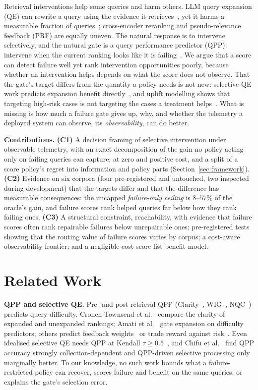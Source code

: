 \documentclass[sigconf,anonymous,review]{acmart}
\begin{document}
Retrieval interventions help some queries and harm others. LLM query
expansion (QE) can rewrite a query using the evidence it
retrieves~\cite{csqe}, yet it harms a measurable fraction of
queries~\cite{weller-qe-fails,qe-fails-unfamiliar}; cross-encoder
reranking and pseudo-relevance feedback (PRF) are equally uneven. The
natural response is to intervene selectively, and the natural gate is
a query performance predictor (QPP): intervene when the current
ranking looks like it is failing~\cite{amati-selective,adaptive-rag}.
We argue that a score can detect failure well yet rank intervention
opportunities poorly, because whether an intervention helps depends on
what the score does not observe.
That the gate's target differs from the quantity a policy needs is
not new: selective-QE work predicts expansion benefit
directly~\cite{selective-qe}, and uplift modelling shows that
targeting high-risk cases is not targeting the cases a treatment
helps~\cite{ascarza-futility,causal-classification}. What is missing
is how much a failure gate gives up, why, and whether the telemetry a
deployed system can observe, its \emph{observability}, can do better.

\textbf{Contributions.}
\textbf{(C1)} A decision framing of selective intervention under
observable telemetry, with an exact decomposition of the gain no
policy acting only on failing queries can capture, at zero and
positive cost, and a split of a score policy's regret into information
and policy parts (Section~\ref{sec:framework}).
\textbf{(C2)} Evidence on six corpora (four pre-registered and
untouched, two inspected during development) that the targets differ and that the difference has
measurable consequences: the uncapped \emph{failure-only ceiling} is
$8$--$57\%$ of the oracle's gain, and failure scores rank helped
queries far below how they rank failing ones.
\textbf{(C3)} A structural constraint, reachability, with evidence
that failure scores often rank repairable failures below unrepairable
ones; pre-registered tests showing that the routing value of failure
scores varies by corpus; a cost-aware observability frontier; and a
negligible-cost score-list benefit model.

\section{Related Work}

\textbf{QPP and selective QE.} Pre- and post-retrieval QPP
(Clarity~\cite{qpp-clarity}, WIG~\cite{wig}, NQC~\cite{nqc}) predicts
query difficulty. Cronen-Townsend et al.~\cite{selective-qe} compare
the clarity of expanded and unexpanded rankings; Amati
et al.~\cite{amati-selective} gate expansion on difficulty predictors;
others predict feedback weights~\cite{lv-zhai-adaptive} or trade
reward against risk~\cite{collins-thompson-risk}. Even idealised selective
QE needs QPP at Kendall $\tau\ge0.5$~\cite{hauff-qpp-effective}, and
Chifu et al.~\cite{chifu-qpp-limits} find QPP accuracy strongly
collection-dependent and QPP-driven selective processing only
marginally better. To our knowledge, no such work bounds what a
failure-restricted policy can recover, scores failure and benefit on
the same queries, or explains the gate's selection error.
\end{document}
